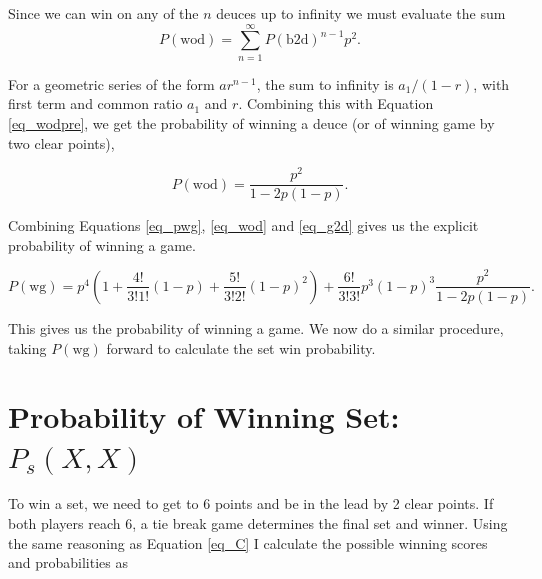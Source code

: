 \documentclass[10pt]{article}
\begin{document}
Since we can win on any of the $n$ deuces up to infinity we must evaluate the sum
\begin{equation}
\label{eq_wodpre}
P(\mathrm{wod}) = \sum_{n=1}^\infty P(\mathrm{b2d})^{n-1} p^2.
\end{equation}

\noindent For a geometric series of the form $a r^{n-1}$, the sum to infinity is $a_1 / (1 - r)$, with first term and common ratio $a_1$ and $r$. Combining this with Equation \ref{eq_wodpre}, we get the probability of winning a deuce (or of winning game by two clear points),

\begin{equation}
\label{eq_wod}
P(\mathrm{wod}) = \frac{p^2}{1 - 2p(1-p)}.
\end{equation}

\noindent Combining Equations \ref{eq_pwg}, \ref{eq_wod} and \ref{eq_g2d} gives us the explicit probability of winning a game.

\begin{equation}
\label{eq_pwgexp}
P(\mathrm{wg}) = p^4 \left( 1 + \frac{4!}{3!1!} (1-p) + \frac{5!}{3!2!}(1-p)^2 \right) + \frac{6!}{3!3!}p^3 ( 1 - p)^3 \frac{p^2}{1 - 2p(1-p)}.
\end{equation}

\noindent This gives us the probability of winning a game. We now do a similar procedure, taking $P(\mathrm{wg})$ forward to calculate the set win probability.



\section{Probability of Winning Set: $P_s(X,X)$}
To win a set, we need to get to 6 points and be in the lead by 2 clear points. If both players reach 6, a tie break game determines the final set and winner. Using the same reasoning as Equation \ref{eq_C} I calculate the possible winning scores and probabilities as
\end{document}
